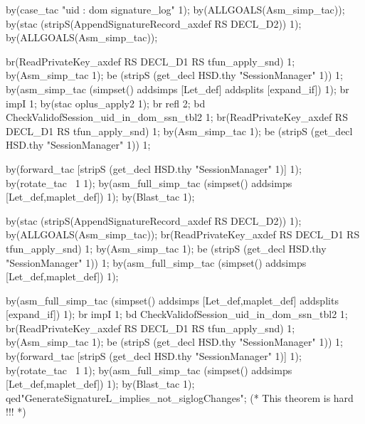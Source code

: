 \documentclass[a4paper,pdftex]{article}
\newenvironment{holz-proof}{\comment}{\endcomment}
\begin{document}
\begin{holz-proof}
by(case_tac "uid : dom signature_log" 1);
by(ALLGOALS(Asm_simp_tac));
by(stac (stripS(AppendSignatureRecord_axdef RS DECL_D2)) 1);
by(ALLGOALS(Asm_simp_tac));

br(ReadPrivateKey_axdef RS DECL_D1 RS tfun_apply_snd) 1;
by(Asm_simp_tac 1);
be (stripS (get_decl HSD.thy "SessionManager" 1)) 1;
by(asm_simp_tac (simpset() addsimps [Let_def] addsplits [expand_if]) 1);
br impI 1;
by(stac oplus_apply2 1); br refl 2;
bd CheckValidofSession_uid_in_dom_ssn_tbl2 1;
br(ReadPrivateKey_axdef RS DECL_D1 RS tfun_apply_snd) 1;
by(Asm_simp_tac 1);
be (stripS (get_decl HSD.thy "SessionManager" 1)) 1;

by(forward_tac [stripS (get_decl HSD.thy "SessionManager" 1)] 1); 
by(rotate_tac ~1 1);
by(asm_full_simp_tac (simpset() addsimps [Let_def,maplet_def]) 1);
by(Blast_tac 1);

by(stac (stripS(AppendSignatureRecord_axdef RS DECL_D2)) 1);
by(ALLGOALS(Asm_simp_tac));
br(ReadPrivateKey_axdef RS DECL_D1 RS tfun_apply_snd) 1;
by(Asm_simp_tac 1);
be (stripS (get_decl HSD.thy "SessionManager" 1)) 1;
by(asm_full_simp_tac (simpset() addsimps [Let_def,maplet_def]) 1);

by(asm_full_simp_tac (simpset() addsimps [Let_def,maplet_def]
                                addsplits [expand_if]) 1);
br impI 1;
bd CheckValidofSession_uid_in_dom_ssn_tbl2 1;
br(ReadPrivateKey_axdef RS DECL_D1 RS tfun_apply_snd) 1;
by(Asm_simp_tac 1);
be (stripS (get_decl HSD.thy "SessionManager" 1)) 1;
by(forward_tac [stripS (get_decl HSD.thy "SessionManager" 1)] 1); 
by(rotate_tac ~1 1);
by(asm_full_simp_tac (simpset() addsimps [Let_def,maplet_def]) 1);
by(Blast_tac 1);
qed"GenerateSignatureL_implies_not_siglogChanges";
(* This theorem is hard !!! *)




\end{holz-proof}
\end{document}
